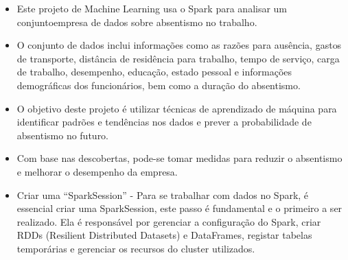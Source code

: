 \documentclass[11pt]{article}
\providecommand{\tightlist}{%
      \setlength{\itemsep}{0pt}\setlength{\parskip}{0pt}}
\begin{document}
    \begin{itemize}
\tightlist
\item
  Este projeto de Machine Learning usa o Spark para analisar um conjuntoempresa
  de dados sobre absentismo no trabalho.
\item
  O conjunto de dados inclui informações como as razões para ausência,
  gastos de transporte, distância de residência para trabalho, tempo de
  serviço, carga de trabalho, desempenho, educação, estado pessoal e
  informações demográficas dos funcionários, bem como a duração do
  absentismo.
\item
  O objetivo deste projeto é utilizar técnicas de aprendizado de máquina
  para identificar padrões e tendências nos dados e prever a
  probabilidade de absentismo no futuro.
\item
  Com base nas descobertas, pode-se tomar medidas para reduzir o
  absentismo e melhorar o desempenho da empresa.

\newline

\item
    Criar uma ``SparkSession'' - Para se trabalhar com dados no Spark, é
    essencial criar uma SparkSession, este passo é fundamental e o primeiro
    a ser realizado. Ela é responsável por gerenciar a configuração do
    Spark, criar RDDs (Resilient Distributed Datasets) e DataFrames,
    registar tabelas temporárias e gerenciar os recursos do cluster
    utilizados.



\end{itemize}
\end{document}
